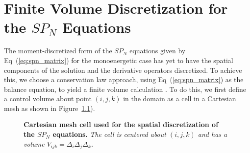 \chapter{Finite Volume Discretization for the $SP_N$ Equations}
\label{chap:spn_spatial_discretization}
The moment-discretized form of the $SP_N$ equations given by
Eq~(\ref{eq:spn_matrix}) for the monoenergetic case has yet to have
the spatial components of the solution and the derivative operators
discretized. To achieve this, we choose a conservation law approach,
using Eq~(\ref{eq:spn_matrix}) as the balance equation, to yield a
finite volume calculation \citep{leveque_finite_2002}. To do this, we
first define a control volume about point $(i,j,k)$ in the domain as a
cell in a Cartesian mesh as shown in Figure~\ref{fig:mesh_cell}).
\begin{figure}[h!]
  \begin{center}
    \scalebox{1.5}{
     }
  \end{center}
  \caption{\textbf{Cartesian mesh cell used for the spatial
      discretization of the $SP_N$ equations.} \textit{The cell is
      centered about $(i,j,k)$ and has a volume $V_{ijk} = \Delta_i
      \Delta_j \Delta_k$.}}
  \label{fig:mesh_cell}
\end{figure}

